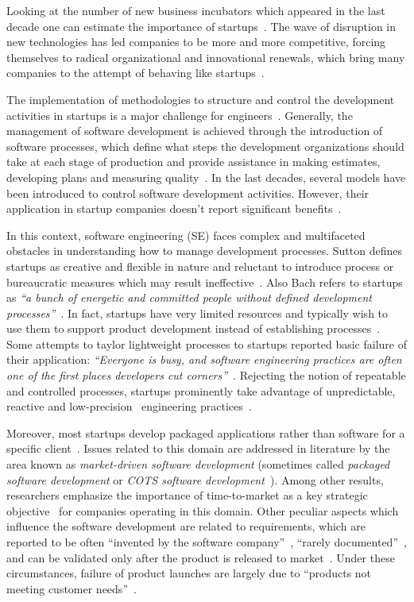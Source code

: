 \documentclass[10pt,journal,letterpaper,compsoc]{IEEEtran}
\begin{document}
Looking at the number of new business incubators which appeared in the last
decade one can estimate the importance of startups~\cite{Grimaldi2005}. The wave
of disruption in new technologies has led companies to be more and more
competitive, forcing themselves to radical organizational and innovational
renewals, which bring many companies to the attempt of behaving like 
startups~\cite{Christensen1997}.

The implementation of methodologies to structure and control the development
activities in startups is a major challenge for engineers~\cite{Coleman2008}.
Generally, the management of software development is achieved through the
introduction of software processes, which define what steps the development
organizations should take at each stage of production and provide assistance in
making estimates, developing plans and measuring quality~\cite{Chroust1996}. In
the last decades, several models have been introduced to control software
development activities. However, their application in startup companies doesn't
report significant benefits~\cite{Coleman2008a, Coleman2008, Sutton2000}.

In this context, software engineering (SE) faces complex and multifaceted
obstacles in understanding how to manage development processes. Sutton defines
startups as creative and flexible in nature and reluctant to introduce process
or bureaucratic measures which may result ineffective~\cite{Sutton2000}. Also
Bach refers to startups as \textit{``a bunch of energetic and committed people
without defined development processes''}~\cite{Bach1998}. In fact, startups have
very limited resources and typically wish to use them to support product
development instead of establishing processes~\cite{Coleman2008, Heitlager2007}.
Some attempts to taylor lightweight processes to startups reported basic failure
of their application: \textit{``Everyone is busy, and software engineering
practices are often one of the first places developers cut 
corners''}~\cite{Martin2007}. Rejecting the notion of repeatable and controlled 
processes, startups prominently take advantage of unpredictable, reactive and 
low-precision~\cite{surviving-os-cockburn} engineering 
practices~\cite{Sutton2000,Tanabian2005, Chorev2006, Kakati2003}.

Moreover, most startups develop packaged applications rather than software for
a specific client~\cite{genome2012}. Issues related to this domain are addressed
in literature by the area known as \textit{market-driven software development}
(sometimes called \textit{packaged software development} or \textit{COTS
software development}~\cite{Alves2006}). Among other results, researchers
emphasize the importance of time-to-market as a key strategic 
objective~\cite{dagMDR,sawyer99} for companies operating in this domain. Other 
peculiar aspects which influence the software development are related to 
requirements, which are reported to be often ``invented by the software 
company''~\cite{512553}, ``rarely documented''~\cite{Karlsson02challengesin}, 
and can be validated only after the product is released to 
market~\cite{dahl2003,Keil:1995}. Under these circumstances, failure of product
launches are largely due to ``products not meeting customer 
needs''~\cite{Alves2006}.
\end{document}
